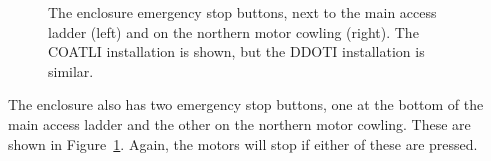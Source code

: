 \begin{figure}
\begin{center}
\end{center}
\caption{The enclosure emergency stop buttons, next to the main access ladder (left) and on the northern motor cowling (right).
\ifddotioan
The COATLI installation is shown, but the DDOTI installation is similar.
\fi
}
\label{figure:enclosure-emergency-stop}
\end{figure}

The enclosure also has two emergency stop buttons, one at the bottom of the main access ladder and the other on the northern motor cowling. These are shown in Figure~\ref{figure:enclosure-emergency-stop}. Again, the motors will stop if either of these are pressed.

